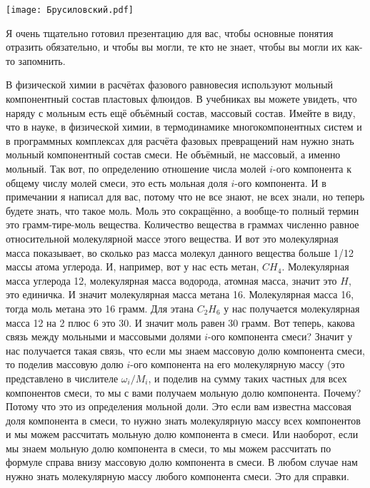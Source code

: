 \documentclass[main.tex]{subfiles}
\begin{document}
\begin{center}
\texttt{[image: Брусиловский.pdf]}
\end{center}

Я очень тщательно готовил презентацию для вас, чтобы основные понятия отразить обязательно, и чтобы вы могли, те кто не знает, чтобы вы могли их как-то запомнить.

В физической химии в расчётах фазового равновесия используют мольный компонентный состав пластовых флюидов.
В учебниках вы можете увидеть, что наряду с мольным есть ещё объёмный состав, массовый состав.
Имейте в виду, что в науке, в физической химии, в термодинамике многокомпонентных систем и в программных комплексах для расчёта фазовых превращений нам нужно знать мольный компонентный состав смеси.
Не объёмный, не массовый, а именно мольный.
Так вот, по определению отношение числа молей $i$-ого компонента к общему числу молей смеси, это есть мольная доля $i$-ого компонента.
И в примечании я написал для вас, потому что не все знают, не всех знали, но теперь будете знать, что такое моль.
Моль это сокращённо, а вообще-то полный термин это грамм-тире-моль вещества.
Количество вещества в граммах численно равное относительной молекулярной массе этого вещества.
И вот это молекулярная масса показывает, во сколько раз масса молекул данного вещества больше 1/12 массы атома углерода.
И, например, вот у нас есть метан, $CH_4$.
Молекулярная масса углерода 12, молекулярная масса водорода, атомная масса, значит это $H$, это единичка.
И значит молекулярная масса метана 16.
Молекулярная масса 16, тогда моль метана это 16 грамм.
Для этана $C_2H_6$ у нас получается молекулярная масса 12 на 2 плюс 6 это 30.
И значит моль равен 30 грамм.
Вот теперь, какова связь между мольными и массовыми долями $i$-ого компонента смеси?
Значит у нас получается такая связь, что если мы знаем массовую долю компонента смеси, то поделив массовую долю $i$-ого компонента на его молекулярную массу (это представлено в числителе $\omega_i/M_i$, и поделив на сумму таких частных для всех компонентов смеси, то мы с вами получаем мольную долю компонента.
Почему?
Потому что это из определения мольной доли.
Это если вам известна массовая доля компонента в смеси, то нужно знать молекулярную массу всех компонентов и мы можем рассчитать мольную долю компонента в смеси.
Или наоборот, если мы знаем мольную долю компонента в смеси, то мы можем рассчитать по формуле справа внизу массовую долю компонента в смеси.
В любом случае нам нужно знать молекулярную массу любого компонента смеси.
Это для справки.
\end{document}
